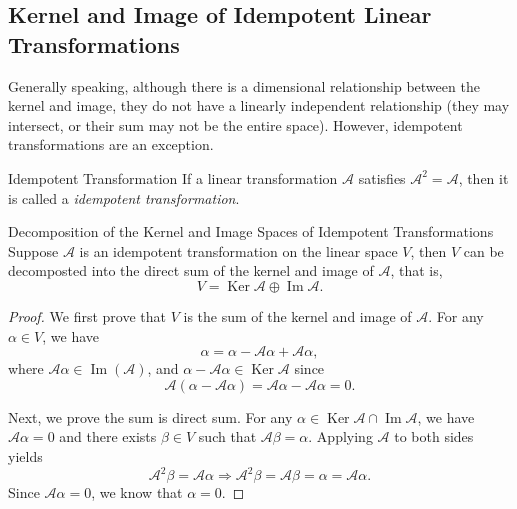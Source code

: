 \subsection{Kernel and Image of Idempotent Linear Transformations}

Generally speaking, although there is a dimensional relationship between the
kernel and image, they do not have a linearly independent relationship
(they may intersect, or their sum may not be the entire space).
However, idempotent transformations are an exception.

\begin{definition}{Idempotent Transformation}{}
  If a linear transformation $\mathcal{A}$ satisfies $\mathcal{A}^2 =
  \mathcal{A}$,
  then it is called a \emph{idempotent transformation}.
\end{definition}

\begin{theorem}{Decomposition of the Kernel and Image Spaces of Idempotent Transformations}{}
  Suppose $\mathcal{A}$ is an idempotent transformation on the linear space $V$,
  then $V$ can be decomposted into the direct sum of the kernel and image of
  $\mathcal{A}$,
  that is,
  \begin{equation}
    V = \operatorname{Ker} \mathcal{A} \oplus \operatorname{Im} \mathcal{A}.
  \end{equation}
\end{theorem}

\begin{proof}
  We first prove that $V$ is the sum of the kernel and image of $\mathcal{A}$.
  For any $\alpha \in V$, we have
  \begin{equation}
  \alpha = \alpha - \mathcal{A} \alpha + \mathcal{A} \alpha,
  \end{equation}
  where $\mathcal{A} \alpha \in \operatorname{Im}(\mathcal{A})$,
  and $\alpha - \mathcal{A}\alpha \in \operatorname{Ker}\mathcal{A}$ since
  \begin{equation}
    \mathcal{A}(\alpha - \mathcal{A} \alpha) = \mathcal{A} \alpha - \mathcal{A} \alpha = 0.
  \end{equation}

  Next, we prove the sum is direct sum.
  For any $\alpha \in \operatorname{Ker} \mathcal{A} \cap \operatorname{Im}
  \mathcal{A}$,
  we have $\mathcal{A} \alpha = 0$ and there exists $\beta \in V$ such that
  $\mathcal{A} \beta = \alpha$.
  Applying $\mathcal{A}$ to both sides yields
  \begin{equation}
    \mathcal{A}^2 \beta = \mathcal{A} \alpha \Rightarrow
    \mathcal{A}^2 \beta = \mathcal{A} \beta = \alpha = \mathcal{A} \alpha.
  \end{equation}
  Since $\mathcal{A} \alpha = 0$, we know that $\alpha = 0$.
\end{proof}


